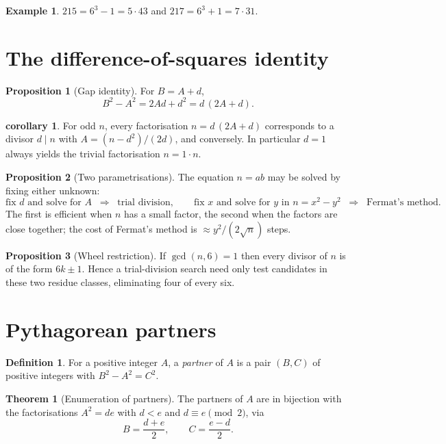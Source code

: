 \documentclass[11pt]{article}
\theoremstyle{definition}
\newtheorem{definition}{Definition}
\newtheorem{proposition}{Proposition}
\newtheorem{theorem}{Theorem}
\newtheorem{example}{Example}
\newtheorem{corollary}{corollary}
\begin{document}
\begin{example}
$215 = 6^3-1 = 5\cdot 43$ and $217 = 6^3+1 = 7\cdot 31$.
\end{example}

\section{The difference-of-squares identity}

\begin{proposition}[Gap identity]
For $B = A + d$,
\[
  B^2 - A^2 = 2Ad + d^2 = d\,(2A+d).
\]
\end{proposition}

\begin{corollary}
For odd $n$, every factorisation $n = d\,(2A+d)$ corresponds to a divisor
$d \mid n$ with $A = (n-d^2)/(2d)$, and conversely. In particular $d=1$ always
yields the trivial factorisation $n = 1 \cdot n$.
\end{corollary}

\begin{proposition}[Two parametrisations]
The equation $n = ab$ may be solved by fixing either unknown:
\[
  \text{fix } d \text{ and solve for } A
  \;\;\Longrightarrow\;\; \text{trial division},
  \qquad
  \text{fix } x \text{ and solve for } y \text{ in } n = x^2-y^2
  \;\;\Longrightarrow\;\; \text{Fermat's method}.
\]
The first is efficient when $n$ has a small factor, the second when the factors
are close together; the cost of Fermat's method is $\approx y^2/(2\sqrt{n})$
steps.
\end{proposition}

\begin{proposition}[Wheel restriction]
If $\gcd(n,6)=1$ then every divisor of $n$ is of the form $6k\pm1$. Hence a
trial-division search need only test candidates in these two residue classes,
eliminating four of every six.
\end{proposition}

\section{Pythagorean partners}\label{sec:partners}

\begin{definition}
For a positive integer $A$, a \emph{partner} of $A$ is a pair $(B,C)$ of
positive integers with $B^2 - A^2 = C^2$.
\end{definition}

\begin{theorem}[Enumeration of partners]
The partners of $A$ are in bijection with the factorisations $A^2 = de$ with
$d<e$ and $d \equiv e \pmod 2$, via
\[
  B = \frac{d+e}{2}, \qquad C = \frac{e-d}{2}.
\]
\end{theorem}
\end{document}
